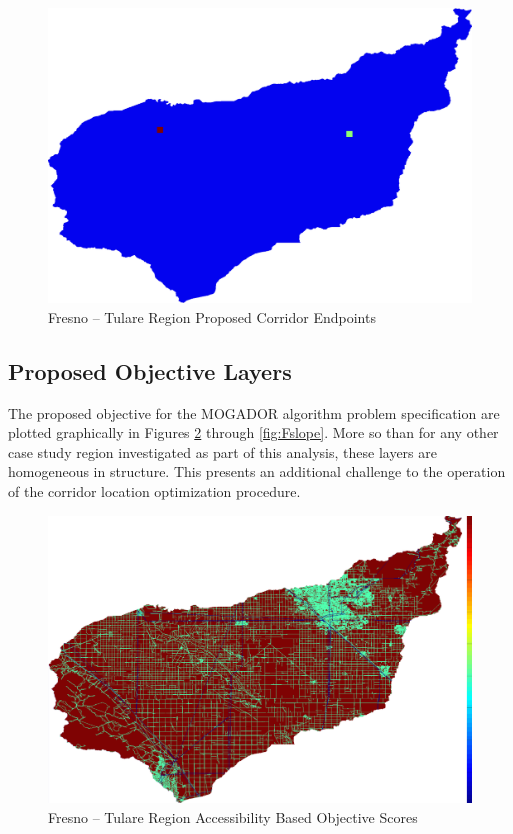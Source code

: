         \begin{figure}[!h]
            \begin{center}
            \includegraphics[width=5.5in]{figures/Fresno_Endpoints.png}   
            \caption{Fresno -- Tulare Region Proposed Corridor Endpoints}
            \label{fig:Fendpoints}
            \end{center}
        \end{figure}

    \subsection{Proposed Objective Layers}
    
The proposed objective for the MOGADOR algorithm problem specification are plotted graphically in Figures \ref{fig:Faccessibility} through \ref{fig:Fslope}. More so than for any other case study region investigated as part of this analysis, these layers are homogeneous in structure. This presents an additional challenge to the operation of the corridor location optimization procedure. 
    
        \begin{figure}[!h]
            \begin{center}
            \includegraphics[width=5.5in]{figures/Fresno_AccessibilityScore.png}   
            \caption{Fresno -- Tulare Region Accessibility Based Objective Scores}
            \label{fig:Faccessibility}
            \end{center}
        \end{figure}

